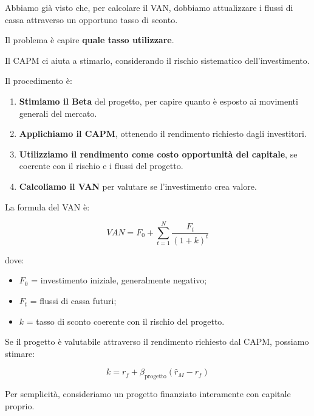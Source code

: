 \noindent Abbiamo già visto che, per calcolare
il VAN, dobbiamo attualizzare i flussi di cassa
attraverso un opportuno tasso di sconto.

\medskip

\noindent Il problema è capire
\textbf{quale tasso utilizzare}.

\medskip

\noindent Il CAPM ci aiuta a stimarlo,
considerando il rischio sistematico
dell'investimento.

\medskip

\noindent Il procedimento è:

\begin{enumerate}
    \item \textbf{Stimiamo il Beta} del progetto,
    per capire quanto è esposto ai movimenti
    generali del mercato.

    \item \textbf{Applichiamo il CAPM},
    ottenendo il rendimento richiesto
    dagli investitori.

    \item \textbf{Utilizziamo il rendimento come
    costo opportunità del capitale}, se coerente
    con il rischio e i flussi del progetto.

    \item \textbf{Calcoliamo il VAN}
    per valutare se l'investimento crea valore.
\end{enumerate}

\noindent La formula del VAN è:

\[
\boxed{
VAN=F_0+\sum_{t=1}^{N}\frac{F_t}{(1+k)^t}
}
\]

\noindent dove:

\begin{itemize}
    \item $F_0$ = investimento iniziale,
    generalmente negativo;

    \item $F_t$ = flussi di cassa futuri;

    \item $k$ = tasso di sconto coerente
    con il rischio del progetto.
\end{itemize}

\noindent Se il progetto è valutabile attraverso
il rendimento richiesto dal CAPM, possiamo stimare:

\[
k=r_f+\beta_{\text{progetto}}(\hat{r}_M-r_f)
\]

\noindent Per semplicità, consideriamo
un progetto finanziato interamente con
capitale proprio.


